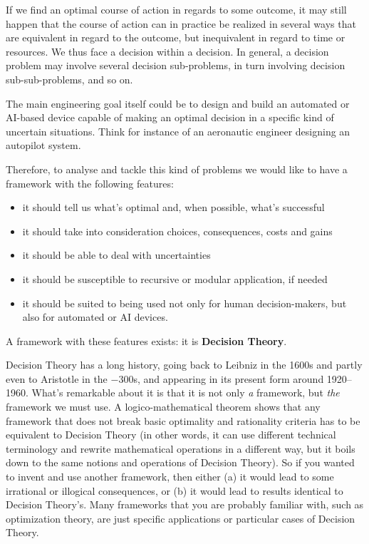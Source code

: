 \documentclass[
  a4paper,
  DIV=11,
  numbers=noendperiod,
  oneside]{scrreprt}
\begin{document}
If we find an optimal course of action in regards to some outcome, it
may still happen that the course of action can in practice be realized
in several ways that are equivalent in regard to the outcome, but
inequivalent in regard to time or resources. We thus face a decision
within a decision. In general, a decision problem may involve several
decision sub-problems, in turn involving decision sub-sub-problems, and
so on.

The main engineering goal itself could be to design and build an
automated or AI-based device capable of making an optimal decision in a
specific kind of uncertain situations. Think for instance of an
aeronautic engineer designing an autopilot system.

Therefore, to analyse and tackle this kind of problems we would like to
have a framework with the following features:

\begin{itemize}
\item
  it should tell us what's optimal and, when possible, what's successful
\item
  it should take into consideration choices, consequences, costs and
  gains
\item
  it should be able to deal with uncertainties
\item
  it should be susceptible to recursive or modular application, if
  needed
\item
  it should be suited to being used not only for human decision-makers,
  but also for automated or AI devices.
\end{itemize}

A framework with these features exists: it is {\textbf{Decision
Theory}}.

Decision Theory has a long history, going back to Leibniz in the 1600s
and partly even to Aristotle in the −300s, and appearing in its present
form around 1920--1960. What's remarkable about it is that it is not
only \emph{a} framework, but \emph{the} framework we must use. A
logico-mathematical theorem shows that any framework that does not break
basic optimality and rationality criteria has to be equivalent to
Decision Theory (in other words, it can use different technical
terminology and rewrite mathematical operations in a different way, but
it boils down to the same notions and operations of Decision Theory). So
if you wanted to invent and use another framework, then either (a) it
would lead to some irrational or illogical consequences, or (b) it would
lead to results identical to Decision Theory's. Many frameworks that you
are probably familiar with, such as optimization theory, are just
specific applications or particular cases of Decision Theory.
\end{document}
